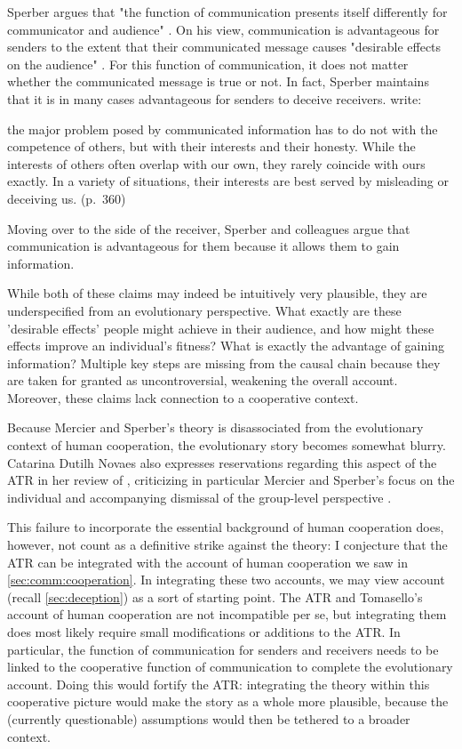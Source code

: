 Sperber argues that "the function of communication presents itself differently for communicator and audience" \citep[p.~411]{Sperber01}. On his view, communication is advantageous for senders to the extent that their communicated message causes "desirable effects on the audience" \citep[p.~406]{Sperber01}. For this function of communication, it does not matter whether the communicated message is true or not. In fact, Sperber maintains that it is in many cases advantageous for senders to deceive receivers. \citet{Sperber10} write:
\begin{quoting}
    the major problem posed by communicated information has to do not with the
competence of others, but with their interests and their honesty. While the interests of others often overlap with our own, they rarely coincide with ours exactly. In a variety of situations, their interests are best served by misleading or deceiving us.
    \hfill (p.~360)
\end{quoting}
Moving over to the side of the receiver, Sperber and colleagues argue that communication is advantageous for them because it allows them to gain information.

While both of these claims may indeed be intuitively very plausible, they are underspecified from an evolutionary perspective. What exactly are these 'desirable effects' people might achieve in their audience, and how might these effects improve an individual's fitness? What is exactly the advantage of gaining information? Multiple key steps are missing from the causal chain because they are taken for granted as uncontroversial, weakening the overall account. Moreover, these claims lack connection to a cooperative context.

Because Mercier and Sperber's theory is disassociated from the evolutionary context of human cooperation, the evolutionary story becomes somewhat blurry.
Catarina Dutilh Novaes also expresses reservations regarding this aspect of the ATR in her \citeyear{Novaes18} review of \citet{MS17}, criticizing in particular Mercier and Sperber's focus on the individual and accompanying dismissal of the group-level perspective \citep[\S 3.3]{Novaes18}.

This failure to incorporate the essential background of human cooperation does, however, not count as a definitive strike against the theory: I conjecture that the ATR can be integrated with the account of human cooperation we saw in \cref{sec:comm:cooperation}. In integrating these two accounts, we may view  account (recall \cref{sec:deception}) as a sort of starting point.
The ATR and Tomasello's account of human cooperation are not incompatible per se, but integrating them does most likely require small modifications or additions to the ATR. In particular, the function of communication for senders and receivers needs to be linked to the cooperative function of communication to complete the evolutionary account.
Doing this would fortify the ATR: integrating the theory within this cooperative picture would make the story as a whole more plausible, because the (currently questionable) assumptions would then be tethered to a broader context.

